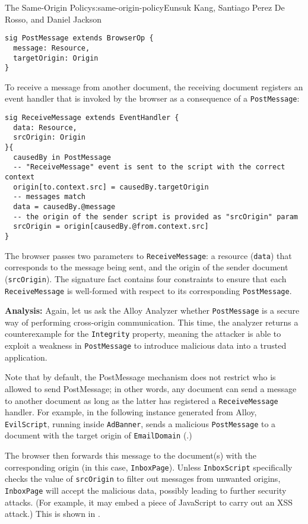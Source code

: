 \begin{aosachapter}{The Same-Origin Policy}{s:same-origin-policy}{Eunsuk Kang, Santiago Perez De Rosso, and Daniel Jackson}
\begin{verbatim}
sig PostMessage extends BrowserOp {
  message: Resource,
  targetOrigin: Origin
}
\end{verbatim}

To receive a message from another document, the receiving document
registers an event handler that is invoked by the browser as a
consequence of a \texttt{PostMessage}:

\begin{verbatim}
sig ReceiveMessage extends EventHandler {
  data: Resource,
  srcOrigin: Origin
}{
  causedBy in PostMessage
  -- "ReceiveMessage" event is sent to the script with the correct context
  origin[to.context.src] = causedBy.targetOrigin
  -- messages match
  data = causedBy.@message
  -- the origin of the sender script is provided as "srcOrigin" param 
  srcOrigin = origin[causedBy.@from.context.src]
}
\end{verbatim}

The browser passes two parameters to \texttt{ReceiveMessage}: a resource
(\texttt{data}) that corresponds to the message being sent, and the
origin of the sender document (\texttt{srcOrigin}). The signature fact
contains four constraints to ensure that each \texttt{ReceiveMessage} is
well-formed with respect to its corresponding \texttt{PostMessage}.

\textbf{Analysis:} Again, let us ask the Alloy Analyzer whether
\texttt{PostMessage} is a secure way of performing cross-origin
communication. This time, the analyzer returns a counterexample for the
\texttt{Integrity} property, meaning the attacker is able to exploit a
weakness in \texttt{PostMessage} to introduce malicious data into a
trusted application.

Note that by default, the PostMessage mechanism does not restrict who is
allowed to send PostMessage; in other words, any document can send a
message to another document as long as the latter has registered a
\texttt{ReceiveMessage} handler. For example, in the following instance
generated from Alloy, \texttt{EvilScript}, running inside
\texttt{AdBanner}, sends a malicious \texttt{PostMessage} to a document
with the target origin of \texttt{EmailDomain}
(.)


The browser then forwards this message to the document(s) with the
corresponding origin (in this case, \texttt{InboxPage}). Unless
\texttt{InboxScript} specifically checks the value of \texttt{srcOrigin}
to filter out messages from unwanted origins, \texttt{InboxPage} will
accept the malicious data, possibly leading to further security attacks.
(For example, it may embed a piece of JavaScript to carry out an XSS
attack.) This is shown in
.


\end{aosachapter}
